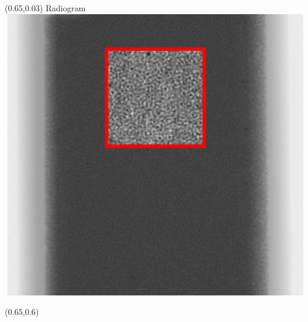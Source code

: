 \begin{frame}[noframenumbering]
\begin{textblock}{0.3}(0.65,0.03)
	\centering
	Radiogram\\
	\includegraphics[width=\textwidth]{Sources/X-DFA/radiogram_ROI_marked.png}
\end{textblock}		

\begin{textblock}{0.3}(0.65,0.6)
	\centering
\end{textblock}
\end{frame}

